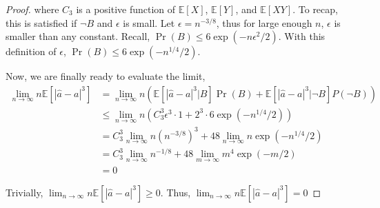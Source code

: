 \begin{proof}
where $C_3$ is a positive function of $\mathbb{E}[X]$, $\mathbb{E}[Y]$, and $\mathbb{E}[XY]$. To recap, this is satisfied if $\neg B$ and $\epsilon$ is small. Let $\epsilon = n^{-3/8}$, thus for large enough $n$, $\epsilon$ is smaller than any constant. Recall, $\Pr(B) \leq 6 \exp( - n \epsilon^2 / 2)$. With this definition of $\epsilon$, $\Pr(B) \leq 6 \exp(-n^{1/4}/2)$.

Now, we are finally ready to evaluate the limit,
\begin{align}
    \lim_{n \rightarrow \infty} n \mathbb{E}[ |\hat{a} - a|^3 ] &= \lim_{n \rightarrow \infty} n \left( \mathbb{E}[ |\hat{a} - a|^3 | B] \Pr(B) + \mathbb{E}[ |\hat{a} - a|^3 | \neg B] P(\neg B) \right) \\
    &\leq \lim_{n \rightarrow \infty} n \left(C_3^3 \epsilon^3 \cdot 1 + 2^3 \cdot 6\exp(-n^{1/4}/2) \right) \\
    &= C_3^3 \lim_{n \rightarrow \infty} n (n^{-3/8})^3 + 48 \lim_{n \rightarrow \infty} n \exp(-n^{1/4}/2) \\
    &= C_3^3 \lim_{n \rightarrow \infty} n^{-1/8} + 48 \lim_{m \rightarrow \infty} m^4 \exp(-m/2) \\
    &= 0
\end{align}

Trivially, $\lim_{n \rightarrow \infty} n \mathbb{E}[ |\hat{a} - a|^3 ] \geq 0$. Thus, $\lim_{n \rightarrow \infty} n \mathbb{E}[ |\hat{a} - a|^3 ] = 0$
\end{proof}



